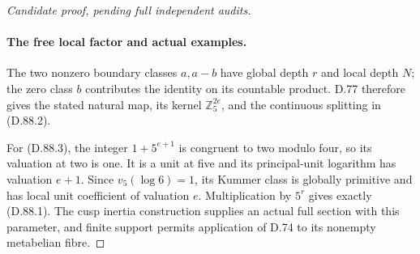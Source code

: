\begin{proof}[Candidate proof, pending full independent audits]
\paragraph{The free local factor and actual examples.}
The two nonzero boundary classes \(a,a-b\) have global
depth \(r\) and local depth \(N\); the zero class \(b\)
contributes the identity on its countable product. D.77 therefore
gives the stated natural map, its kernel \(\mathbb Z_5^{2e}\),
and the continuous splitting in (D.88.2).

For (D.88.3), the integer \(1+5^{e+1}\) is congruent to two
modulo four, so its valuation at two is one. It is a unit at
five and its principal-unit logarithm has valuation \(e+1\).
Since \(v_5(\log6)=1\), its Kummer class is globally primitive
and has local unit coefficient of valuation \(e\).
Multiplication by \(5^r\) gives exactly (D.88.1).
The cusp inertia construction supplies an actual full section
with this parameter, and finite support permits application
of D.74 to its nonempty metabelian fibre.
\end{proof}

